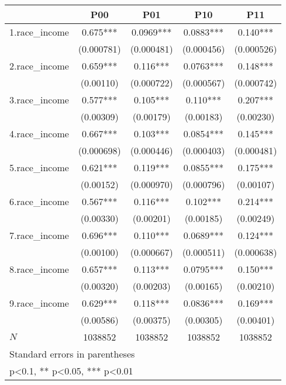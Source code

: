 {
\def\sym#1{\ifmmode^{#1}\else\(^{#1}\)\fi}
\begin{tabular}{l*{4}{c}}
\hline\hline
            &\multicolumn{1}{c}{P00}&\multicolumn{1}{c}{P01}&\multicolumn{1}{c}{P10}&\multicolumn{1}{c}{P11}\\
\hline
1.race\_income&       0.675***&      0.0969***&      0.0883***&       0.140***\\
            &  (0.000781)   &  (0.000481)   &  (0.000456)   &  (0.000526)   \\
[1em]
2.race\_income&       0.659***&       0.116***&      0.0763***&       0.148***\\
            &   (0.00110)   &  (0.000722)   &  (0.000567)   &  (0.000742)   \\
[1em]
3.race\_income&       0.577***&       0.105***&       0.110***&       0.207***\\
            &   (0.00309)   &   (0.00179)   &   (0.00183)   &   (0.00230)   \\
[1em]
4.race\_income&       0.667***&       0.103***&      0.0854***&       0.145***\\
            &  (0.000698)   &  (0.000446)   &  (0.000403)   &  (0.000481)   \\
[1em]
5.race\_income&       0.621***&       0.119***&      0.0855***&       0.175***\\
            &   (0.00152)   &  (0.000970)   &  (0.000796)   &   (0.00107)   \\
[1em]
6.race\_income&       0.567***&       0.116***&       0.102***&       0.214***\\
            &   (0.00330)   &   (0.00201)   &   (0.00185)   &   (0.00249)   \\
[1em]
7.race\_income&       0.696***&       0.110***&      0.0689***&       0.124***\\
            &   (0.00100)   &  (0.000667)   &  (0.000511)   &  (0.000638)   \\
[1em]
8.race\_income&       0.657***&       0.113***&      0.0795***&       0.150***\\
            &   (0.00320)   &   (0.00203)   &   (0.00165)   &   (0.00210)   \\
[1em]
9.race\_income&       0.629***&       0.118***&      0.0836***&       0.169***\\
            &   (0.00586)   &   (0.00375)   &   (0.00305)   &   (0.00401)   \\
\hline
\(N\)       &     1038852   &     1038852   &     1038852   &     1038852   \\
\hline\hline
\multicolumn{5}{l}{\footnotesize Standard errors in parentheses}\\
\multicolumn{5}{l}{\footnotesize * p<0.1, ** p<0.05, *** p<0.01}\\
\end{tabular}
}
